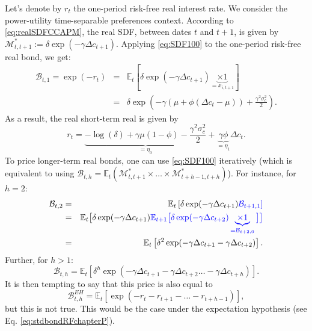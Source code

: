 \documentclass[
  12pt,
]{book}
\theoremstyle{definition}
\theoremstyle{definition}
\theoremstyle{definition}
\theoremstyle{definition}
\theoremstyle{remark}
\begin{document}
Let's denote by \(r_{t}\) the one-period risk-free real interest rate. We consider the power-utility time-separable preferences context. According to \eqref{eq:realSDFCCAPM}, the real SDF, between dates \(t\) and \(t+1\), is given by \(\mathcal{M}^*_{t,t+1}:=\delta\exp(-\gamma \Delta c_{t+1})\). Applying \eqref{eq:SDF100} to the one-period risk-free real bond, we get:
\begin{eqnarray*}
\mathcal{B}_{t,1} = \exp(-r_{t}) &=& \mathbb{E}_t [ \delta \exp(-\gamma \Delta c_{t+1}) \underbrace{\times 1}_{= x_{i,t+1}} ]\\
&=& \delta \exp\left(-\gamma(\mu + \phi (\Delta c_t - \mu))+\frac{\gamma^2\sigma_c^2}{2}\right).
\end{eqnarray*}
As a result, the real short-term real is given by
\begin{equation}
r_{t} = \underbrace{- \log(\delta) + \gamma \mu (1-\phi)  - \frac{\gamma^2\sigma_c^2}{2}}_{=\eta_0} + \underbrace{\gamma \phi}_{=\eta_1} \Delta c_t.\label{eq:rCCAPM}
\end{equation}
To price longer-term real bonds, one can use \eqref{eq:SDF100} iteratively (which is equivalent to using \(\mathcal{B}_{t,h} = \mathbb{E}_t(\mathcal{M}^*_{t,t+1}\times\dots\times\mathcal{M}^*_{t+h-1,t+h})\)). For instance, for \(h=2\):
\begin{eqnarray*}
\mathcal{B}_{t,2} &=&  \mathbb{E}_t \left[ \delta \exp(-\gamma \Delta c_{t+1}) \color{blue}{\mathcal{B}_{t+1,1}} \right]\\
&=& \mathbb{E}_t \big[ \delta \exp(-\gamma \Delta c_{t+1}) \color{blue}{\mathbb{E}_{t+1} \big[ \delta \exp(-\gamma \Delta c_{t+2}) \underbrace{\times 1}_{=\mathcal{B}_{t+2,0}} \big]} \big]\\
&=& \mathbb{E}_t \left[ \delta^2 \exp(-\gamma \Delta c_{t+1} - \gamma \Delta c_{t+2}) \right].
\end{eqnarray*}
Further, for \(h>1\):
\begin{equation}
\mathcal{B}_{t,h} = \mathbb{E}_t \left[ \delta^h \exp(-\gamma \Delta c_{t+1} - \gamma \Delta c_{t+2} \dots - \gamma \Delta c_{t+h}) \right].\label{eq:PthCCAPM}
\end{equation}
It is then tempting to say that this price is also equal to
\begin{equation}
\mathcal{B}^{EH}_{t,h} = \mathbb{E}_t \left[ \exp(- r_{t} - r_{t+1} - \dots - r_{t+h-1}) \right],\label{eq:CCAPMEH}
\end{equation}
but this is not true. This would be the case under the expectation hypothesis (see Eq. \eqref{eq:stdbondRFchapterP}).
\end{document}
